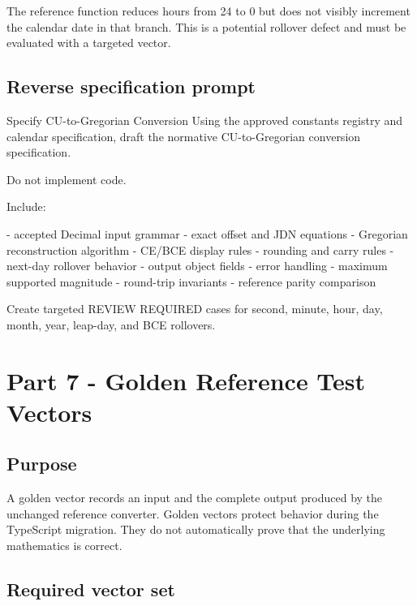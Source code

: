 \documentclass[11pt,letterpaper]{article}
\begin{document}
The reference function reduces hours from 24 to 0 but does not visibly
increment the calendar date in that branch. This is a potential rollover defect
and must be evaluated with a targeted vector.

\subsection{Reverse specification prompt}

\begin{promptbox}{Specify CU-to-Gregorian Conversion}
Using the approved constants registry and calendar specification,
draft the normative CU-to-Gregorian conversion specification.

Do not implement code.

Include:

- accepted Decimal input grammar
- exact offset and JDN equations
- Gregorian reconstruction algorithm
- CE/BCE display rules
- rounding and carry rules
- next-day rollover behavior
- output object fields
- error handling
- maximum supported magnitude
- round-trip invariants
- reference parity comparison

Create targeted REVIEW REQUIRED cases for second, minute, hour,
day, month, year, leap-day, and BCE rollovers.
\end{promptbox}

\section{Part 7 - Golden Reference Test Vectors}

\subsection{Purpose}

A golden vector records an input and the complete output produced by the
unchanged reference converter. Golden vectors protect behavior during the
TypeScript migration. They do not automatically prove that the underlying
mathematics is correct.

\subsection{Required vector set}
\end{document}
